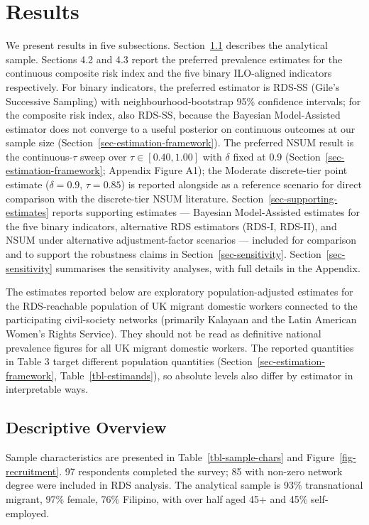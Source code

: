 \documentclass[
  12pt,
  letterpaper,
  DIV=11,
  numbers=noendperiod]{scrartcl}
\begin{document}
\section{Results}\label{sec-results}

We present results in five subsections. Section~\ref{sec-descriptive}
describes the analytical sample. Sections 4.2 and 4.3 report the
preferred prevalence estimates for the continuous composite risk index
and the five binary ILO-aligned indicators respectively. For binary
indicators, the preferred estimator is RDS-SS (Gile's Successive
Sampling) with neighbourhood-bootstrap 95\% confidence intervals; for
the composite risk index, also RDS-SS, because the Bayesian
Model-Assisted estimator does not converge to a useful posterior on
continuous outcomes at our sample size
(Section~\ref{sec-estimation-framework}). The preferred NSUM result is
the continuous-\(\tau\) sweep over \(\tau \in [0.40, 1.00]\) with
\(\delta\) fixed at 0.9 (Section~\ref{sec-estimation-framework};
Appendix Figure A1); the Moderate discrete-tier point estimate
(\(\delta = 0.9\), \(\tau = 0.85\)) is reported alongside as a reference
scenario for direct comparison with the discrete-tier NSUM literature.
Section~\ref{sec-supporting-estimates} reports supporting estimates ---
Bayesian Model-Assisted estimates for the five binary indicators,
alternative RDS estimators (RDS-I, RDS-II), and NSUM under alternative
adjustment-factor scenarios --- included for comparison and to support
the robustness claims in Section~\ref{sec-sensitivity}.
Section~\ref{sec-sensitivity} summarises the sensitivity analyses, with
full details in the Appendix.

The estimates reported below are exploratory population-adjusted
estimates for the RDS-reachable population of UK migrant domestic
workers connected to the participating civil-society networks (primarily
Kalayaan and the Latin American Women's Rights Service). They should not
be read as definitive national prevalence figures for all UK migrant
domestic workers. The reported quantities in Table 3 target different
population quantities (Section~\ref{sec-estimation-framework},
Table~\ref{tbl-estimands}), so absolute levels also differ by estimator
in interpretable ways.

\subsection{Descriptive Overview}\label{sec-descriptive}

Sample characteristics are presented in Table~\ref{tbl-sample-chars} and
Figure~\ref{fig-recruitment}. 97 respondents completed the survey; 85
with non-zero network degree were included in RDS analysis. The
analytical sample is 93\% transnational migrant, 97\% female, 76\%
Filipino, with over half aged 45+ and 45\% self-employed.
\end{document}
